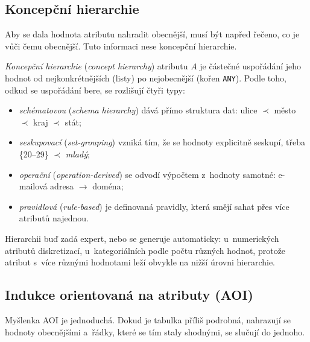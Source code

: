 \documentclass[11pt,a4paper]{article}
\theoremstyle{definition}
\begin{document}
\subsection{Koncepční hierarchie}

Aby se dala hodnota atributu nahradit obecnější, musí být napřed řečeno, co je vůči čemu
obecnější. Tuto informaci nese koncepční hierarchie.

\begin{defbox}
\emph{Koncepční hierarchie} (\emph{concept hierarchy}) atributu $A$ je částečné uspořádání
jeho hodnot od nejkonkrétnějších (listy) po nejobecnější (kořen \texttt{ANY}). Podle toho,
odkud se uspořádání bere, se rozlišují čtyři typy:
\begin{itemize}
\item \emph{schématovou} (\emph{schema hierarchy}) dává přímo struktura dat: ulice $\prec$
      město $\prec$ kraj $\prec$ stát;
\item \emph{seskupovací} (\emph{set-grouping}) vzniká tím, že se hodnoty explicitně seskupí,
      třeba \{20--29\} $\prec$ \emph{mladý};
\item \emph{operační} (\emph{operation-derived}) se odvodí výpočtem z~hodnoty samotné:
      e-mailová adresa $\to$ doména;
\item \emph{pravidlová} (\emph{rule-based}) je definovaná pravidly, která smějí sahat přes
      více atributů najednou.
\end{itemize}
Hierarchii buď zadá expert, nebo se generuje automaticky: u~numerických atributů
diskretizací, u~kategoriálních podle počtu různých hodnot, protože atribut s~více různými
hodnotami leží obvykle na nižší úrovni hierarchie.
\end{defbox}

\subsection{Indukce orientovaná na atributy (AOI)}

Myšlenka AOI je jednoduchá. Dokud je tabulka příliš podrobná, nahrazují se hodnoty
obecnějšími a~řádky, které se tím staly shodnými, se slučují do jednoho.
\end{document}
